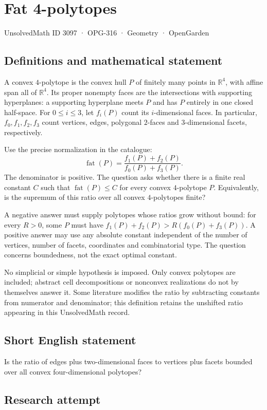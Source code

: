 \documentclass[11pt,a4paper]{article}
\begin{document}
\section*{Fat 4-polytopes}\label{3097}
{\small UnsolvedMath ID 3097 · OPG-316 · Geometry · OpenGarden}
\subsection{Definitions and mathematical statement}
A convex $4$-polytope is the convex hull $P$ of finitely many points in
$\mathbb R^4$, with affine span all of $\mathbb R^4$. Its proper nonempty
faces are the intersections with supporting hyperplanes: a supporting
hyperplane meets $P$ and has $P$ entirely in one closed half-space.
For $0\le i\le3$, let $f_i(P)$ count its $i$-dimensional faces.
In particular, $f_0,f_1,f_2,f_3$ count vertices, edges, polygonal
$2$-faces and $3$-dimensional facets, respectively.

Use the precise normalization in the catalogue:
\[
 \operatorname{fat}(P)=\frac{f_1(P)+f_2(P)}{f_0(P)+f_3(P)}.
\]
The denominator is positive. The question asks whether there is a
finite real constant $C$ such that $\operatorname{fat}(P)\le C$ for
every convex $4$-polytope $P$.
Equivalently, is the supremum of this ratio over all convex
$4$-polytopes finite?

A negative answer must supply polytopes whose ratios grow without bound:
for every $R>0$, some $P$ must have $f_1(P)+f_2(P)>R(f_0(P)+f_3(P))$.
A positive answer may use any absolute constant independent of the
number of vertices, number of facets, coordinates and combinatorial type.
The question concerns boundedness, not the exact optimal constant.

No simplicial or simple hypothesis is imposed. Only convex polytopes are
included; abstract cell decompositions or nonconvex realizations do not
by themselves answer it. Some literature modifies the ratio by subtracting
constants from numerator and denominator; this definition retains the
unshifted ratio appearing in this UnsolvedMath record.
\subsection{Short English statement}
Is the ratio of edges plus two-dimensional faces to vertices plus facets bounded over all convex four-dimensional polytopes?
\subsection{Research attempt}
\end{document}
